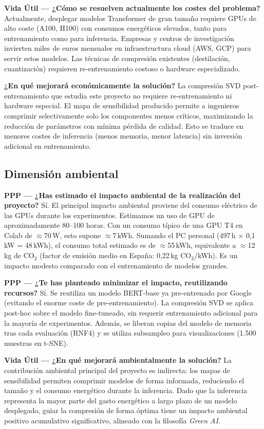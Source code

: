 \documentclass[11pt, a4paper]{article}
\begin{document}
\textbf{Vida Útil --- ¿Cómo se resuelven actualmente los costes del problema?} Actualmente, desplegar modelos Transformer de gran tamaño requiere GPUs de alto coste (A100, H100) con consumos energéticos elevados, tanto para entrenamiento como para inferencia. Empresas y centros de investigación invierten miles de euros mensuales en infraestructura cloud (AWS, GCP) para servir estos modelos. Las técnicas de compresión existentes (destilación, cuantización) requieren re-entrenamiento costoso o hardware especializado.

\textbf{¿En qué mejorará económicamente la solución?} La compresión SVD post-entrenamiento que estudia este proyecto no requiere re-entrenamiento ni hardware especial. El mapa de sensibilidad producido permite a ingenieros comprimir selectivamente solo los componentes menos críticos, maximizando la reducción de parámetros con mínima pérdida de calidad. Esto se traduce en menores costes de inferencia (menos memoria, menor latencia) sin inversión adicional en entrenamiento.

\subsection{Dimensión ambiental}

\textbf{PPP --- ¿Has estimado el impacto ambiental de la realización del proyecto?} Sí. El principal impacto ambiental proviene del consumo eléctrico de las GPUs durante los experimentos. Estimamos un uso de GPU de aproximadamente 80--100 horas. Con un consumo típico de una GPU T4 en Colab de $\approx$70\,W, esto supone $\approx$7\,kWh. Sumando el PC personal (497\,h $\times$ 0,1\,kW = 48\,kWh), el consumo total estimado es de $\approx$55\,kWh, equivalente a $\approx$12\,kg de CO$_2$ (factor de emisión medio en España: 0,22\,kg CO$_2$/kWh). Es un impacto modesto comparado con el entrenamiento de modelos grandes.

\textbf{PPP --- ¿Te has planteado minimizar el impacto, reutilizando recursos?} Sí. Se reutiliza un modelo BERT-base ya pre-entrenado por Google (evitando el enorme coste de pre-entrenamiento). La compresión SVD se aplica post-hoc sobre el modelo fine-tuneado, sin requerir entrenamiento adicional para la mayoría de experimentos. Además, se liberan copias del modelo de memoria tras cada evaluación (RNF4) y se utiliza subsampleo para visualizaciones (1.500 muestras en t-SNE).

\textbf{Vida Útil --- ¿En qué mejorará ambientalmente la solución?} La contribución ambiental principal del proyecto es indirecta: los mapas de sensibilidad permiten comprimir modelos de forma informada, reduciendo el tamaño y el consumo energético durante la inferencia. Dado que la inferencia representa la mayor parte del gasto energético a largo plazo de un modelo desplegado, guiar la compresión de forma óptima tiene un impacto ambiental positivo acumulativo significativo, alineado con la filosofía \textit{Green AI}.
\end{document}
